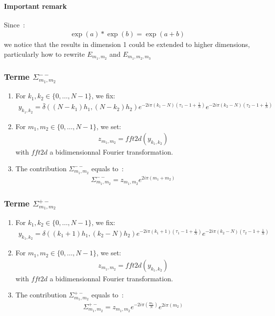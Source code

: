 \paragraph{Important remark\\}
Since~:
\begin{align*}
  \exp(a) * \exp(b) = \exp(a+b)
\end{align*}
we notice that the results in dimension 1 could be extended to higher dimensions, particularly how to rewrite $E_{m_1,m_2}$ and $E_{m_1,m_2,m_3}$

\subsubsection{Terme $\Sigma_{m_1,m_2}^{--}$}

\begin{enumerate}
\item For $k_1,k_2\in\{0,\hdots,N-1\}$, we fix:
\begin{align*}
y_{k_1,k_2}=\bar{\delta}((N-k_1)h_1,(N-k_2)h_2)e^{-2i\pi (k_1-N)\left(\tau_1-1+\frac{1}{N}\right)}e^{-2i\pi (k_2-N)\left(\tau_2-1+\frac{1}{N}\right)}
\end{align*}
\item For $m_1,m_2\in\{0,\hdots,N-1\}$, we set:
\begin{align*}
  z_{m_1,m_2}=fft2d(y_{k_1,k_2})
\end{align*}
with $fft2d$ a bidimensionnal Fourier transformation.
\item The contribution $\Sigma_{m_1,m_2}^{--}$ equals to~:
\begin{align*}
  \Sigma_{m_1,m_2}^{--}=z_{m_1,m_2}e^{2i\pi\left(m_1+m_2\right)}
\end{align*}
\end{enumerate}

\subsubsection{Terme $\Sigma_{m_1,m_2}^{+-}$}

\begin{enumerate}
\item For $k_1,k_2\in\{0,\hdots,N-1\}$, we fix:
\begin{align*}
y_{k_1,k_2}= \delta((k_1+1)h_1,(k_2-N)h_2)e^{-2i\pi (k_1+1)\left(\tau_1-1+\frac{1}{N}\right)}e^{-2i\pi (k_2-N)\left(\tau_2-1+\frac{1}{N}\right)}
\end{align*}
\item For $m_1,m_2\in\{0,\hdots,N-1\}$, we set:
\begin{align*}
  z_{m_1,m_2}=fft2d(y_{k_1,k_2})
\end{align*}
with $fft2d$ a bidimensionnal Fourier transformation.
\item The contribution $\Sigma_{m_1,m_2}^{+-}$ equals to~:
\begin{align*}
  \Sigma_{m_1,m_2}^{+-}=z_{m_1,m_2}e^{-2i\pi\left(\frac{m_1}{N}\right)} e^{2i\pi\left(m_2\right)}
\end{align*}
\end{enumerate}


